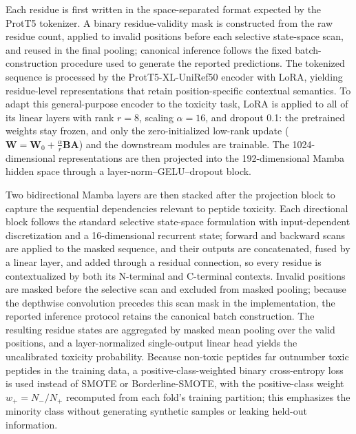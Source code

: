 \documentclass[12pt]{article}
\begin{document}
Each residue is first written in the space-separated format expected by the
ProtT5 tokenizer. A binary residue-validity mask is constructed from the raw
residue count, applied to invalid positions before each selective state-space
scan, and reused in the final pooling; canonical inference follows the fixed
batch-construction procedure used to generate the reported predictions. The tokenized sequence is processed by
the ProtT5-XL-UniRef50 encoder \cite{elnaggar2022prottrans} with LoRA, yielding
residue-level representations that retain position-specific contextual
semantics. To adapt this general-purpose encoder to the toxicity task, LoRA
\cite{hu2022lora} is applied to all of its linear layers with rank $r=8$,
scaling $\alpha=16$, and dropout 0.1: the pretrained weights stay frozen, and
only the zero-initialized low-rank update ($\mathbf W = \mathbf W_0 +
\frac{\alpha}{r}\mathbf B\mathbf A$) and the downstream modules are trainable.
The 1024-dimensional representations are then projected into the
192-dimensional Mamba hidden space through a layer-norm--GELU--dropout block.

Two bidirectional Mamba layers \cite{gu2024mamba} are then stacked after the
projection block to capture the sequential dependencies relevant to peptide
toxicity. Each directional block follows the standard selective state-space
formulation with input-dependent discretization and a 16-dimensional recurrent
state; forward and backward scans are applied to the masked sequence, and their
outputs are concatenated, fused by a linear layer, and added through a residual
connection, so every residue is contextualized by both its N-terminal and
C-terminal contexts. Invalid positions are masked before the selective scan
and excluded from masked pooling; because the depthwise convolution precedes
this scan mask in the implementation, the reported inference protocol retains
the canonical batch construction. The resulting residue states are
aggregated by masked mean pooling over the valid positions, and a
layer-normalized single-output linear head yields the uncalibrated toxicity
probability. Because non-toxic peptides far outnumber toxic peptides in the
training data, a positive-class-weighted binary cross-entropy loss is used
instead of SMOTE or Borderline-SMOTE, with the positive-class weight
$w_+ = N_-/N_+$ recomputed from each fold's training partition; this emphasizes
the minority class without generating synthetic samples or leaking held-out
information.
\end{document}
